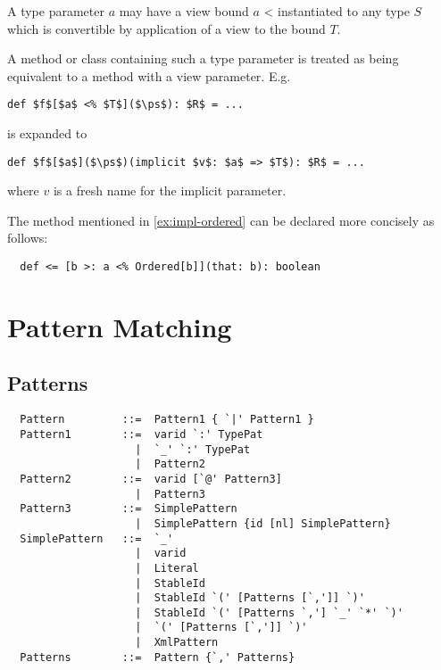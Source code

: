 A type parameter $a$ may have a view bound
\lstinline@$a$ <% $T$@. In this case the type parameter may be
instantiated to any type $S$ which is convertible by application of a
view to the bound $T$.

A method or class containing such a type parameter is treated as being
equivalent to a
method with a view parameter. E.g.
\begin{lstlisting}
def $f$[$a$ <% $T$]($\ps$): $R$ = ...
\end{lstlisting}
is expanded to 
\begin{lstlisting}
def $f$[$a$]($\ps$)(implicit $v$: $a$ => $T$): $R$ = ...
\end{lstlisting}
where $v$ is a fresh name for the implicit parameter.

\example The \code{<=} method mentioned in \ref{ex:impl-ordered} can be declared
more concisely as follows:
\begin{lstlisting}
  def <= [b >: a <% Ordered[b]](that: b): boolean
\end{lstlisting}

\chapter{Pattern Matching}

\section{Patterns}

\label{sec:patterns}

\syntax\begin{lstlisting}
  Pattern         ::=  Pattern1 { `|' Pattern1 }
  Pattern1        ::=  varid `:' TypePat
                    |  `_' `:' TypePat
                    |  Pattern2
  Pattern2        ::=  varid [`@' Pattern3]
                    |  Pattern3
  Pattern3        ::=  SimplePattern 
                    |  SimplePattern {id [nl] SimplePattern}
  SimplePattern   ::=  `_'
                    |  varid
                    |  Literal
                    |  StableId
                    |  StableId `(' [Patterns [`,']] `)'
                    |  StableId `(' [Patterns `,'] `_' `*' `)'
                    |  `(' [Patterns [`,']] `)'
                    |  XmlPattern
  Patterns        ::=  Pattern {`,' Patterns}
\end{lstlisting}


